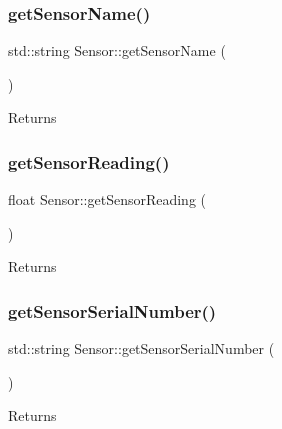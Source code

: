 \subsubsection{\texorpdfstring{get\+Sensor\+Name()}{getSensorName()}}
{\footnotesize\ttfamily std\+::string Sensor\+::get\+Sensor\+Name (\begin{DoxyParamCaption}{ }\end{DoxyParamCaption})}





\begin{DoxyReturn}{Returns}

\end{DoxyReturn}
\mbox{\label{class_sensor_a399de2e826af7fe32a579f93dbfad1b2}} 
\subsubsection{\texorpdfstring{get\+Sensor\+Reading()}{getSensorReading()}}
{\footnotesize\ttfamily float Sensor\+::get\+Sensor\+Reading (\begin{DoxyParamCaption}{ }\end{DoxyParamCaption})}





\begin{DoxyReturn}{Returns}

\end{DoxyReturn}
\mbox{\label{class_sensor_ad59209d7c8aed356ba8aa2ff832c37cc}} 
\subsubsection{\texorpdfstring{get\+Sensor\+Serial\+Number()}{getSensorSerialNumber()}}
{\footnotesize\ttfamily std\+::string Sensor\+::get\+Sensor\+Serial\+Number (\begin{DoxyParamCaption}{ }\end{DoxyParamCaption})}





\begin{DoxyReturn}{Returns}

\end{DoxyReturn}
\mbox{\label{class_sensor_add1838a85fc68b6c0b61a4a233e5fcaf}} 
